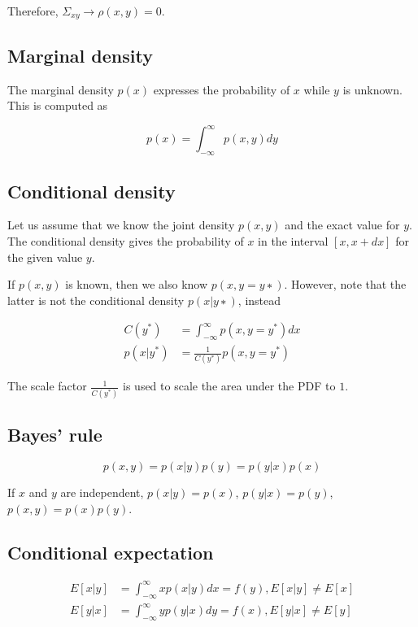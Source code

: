 Therefore, $\Sigma_{xy} \rightarrow \rho(x, y) = 0$.

\subsection{Marginal density}

The marginal density $p(x)$ expresses the probability of $x$ while $y$ is
unknown. This is computed as

\begin{equation*}
  p(x) = \int_{-\infty}^\infty p(x, y) dy
\end{equation*}

\subsection{Conditional density}

Let us assume that we know the joint density $p(x, y)$ and the exact value for
$y$. The conditional density gives the probability of $x$ in the interval
$[x, x + dx]$ for the given value $y$.

If $p(x, y)$ is known, then we also know $p(x, y = y∗)$. However, note that the
latter is not the conditional density $p(x|y∗)$, instead

\begin{align*}
  C(y^*) &= \int_{-\infty}^\infty p(x, y = y^*) dx \\
  p(x|y^*) &= \frac{1}{C(y^*)} p(x, y = y^*)
\end{align*}

The scale factor $\frac{1}{C(y^*)}$ is used to scale the area under the PDF to
$1$.

\subsection{Bayes' rule}

\begin{equation*}
  p(x, y) = p(x|y) p(y) = p(y|x) p(x)
\end{equation*}

If $x$ and $y$ are independent, $p(x|y) = p(x)$, $p(y|x) = p(y)$,
$p(x, y) = p(x)p(y)$.

\subsection{Conditional expectation}

\begin{align*}
  E[x|y] &= \int_{-\infty}^\infty x p(x|y) dx = f(y), E[x|y] \neq E[x] \\
  E[y|x] &= \int_{-\infty}^\infty y p(y|x) dy = f(x), E[y|x] \neq E[y]
\end{align*}


